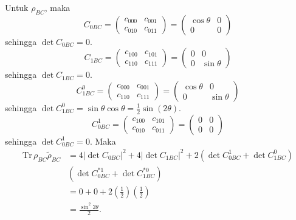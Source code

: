 Untuk $\rho_{BC}$, maka
\begin{equation}
	C_{0BC}=
	\begin{pmatrix}
		c_{000} & c_{001} \\
		c_{010} & c_{011}
	\end{pmatrix}=
	\begin{pmatrix}
		\cos\theta & 0 \\
		0 & 0
	\end{pmatrix}
\end{equation}
sehingga $\det C_{0BC} = 0$.
\begin{equation}
	C_{1BC}=
	\begin{pmatrix}
		c_{100} & c_{101} \\
		c_{110} & c_{111}
	\end{pmatrix}=
	\begin{pmatrix}
		0 & 0 \\
		0 & \sin\theta
	\end{pmatrix}
\end{equation}
sehingga $\det C_{1BC} = 0$.
\begin{equation}
	C_{1BC}^0=
	\begin{pmatrix}
		c_{000} & c_{001} \\
		c_{110} & c_{111}
	\end{pmatrix}=
	\begin{pmatrix}
		\cos\theta & 0 \\
		0 & \sin\theta
	\end{pmatrix}
\end{equation}
sehingga $\det C_{1BC}^0 = \sin\theta \cos\theta = \frac{1}{2}\sin(2\theta)$.
\begin{equation}
	C_{0BC}^1=
	\begin{pmatrix}
		c_{100} & c_{101} \\
		c_{010} & c_{011}
	\end{pmatrix}=
	\begin{pmatrix}
		0 & 0 \\
		0 & 0
	\end{pmatrix}
\end{equation}
sehingga $\det C_{0BC}^1 = 0$. Maka
\begin{equation}
	\begin{aligned}
		\mathrm{Tr}\,\rho_{BC}\tilde{\rho}_{BC}
		&=4 |\det C_{0BC}|^2+ 4 |\det C_{1BC}|^2+ 2 (\det C_{0BC}^1 + \det C_{1BC}^0)\\
		&(\det C^{*1}_{0BC} + \det C^{*0}_{1BC})\\
		&=0+0+2(\frac{1}{2})(\frac{1}{2})\\
		&=\frac{\sin^2 2\theta}{2}.
	\end{aligned}
\end{equation}

